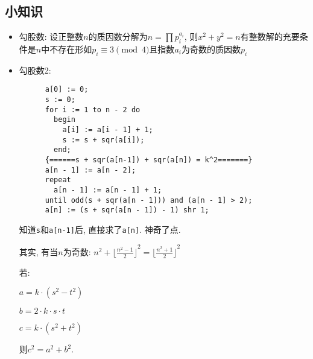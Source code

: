\documentclass[landscape, twocolumn, 8pt, a4paper, twoside]{extarticle}
\begin{document}
  \subsection{小知识}
  \begin{itemize}
  \item 勾股数: 设正整数$n$的质因数分解为$n = \prod p_i ^ {a_i}$, 
    则$x^2+y^2=n$有整数解的充要条件是$n$中不存在形如$p_i \equiv 3\pmod{4}$且指数$a_i$为奇数的质因数$p_i$
  \item 勾股数2: 
    \begin{verbatim}
      a[0] := 0;
      s := 0;
      for i := 1 to n - 2 do
        begin
          a[i] := a[i - 1] + 1;
          s := s + sqr(a[i]);
        end;
      {======s + sqr(a[n-1]) + sqr(a[n]) = k^2=======}
      a[n - 1] := a[n - 2];
      repeat
        a[n - 1] := a[n - 1] + 1;
      until odd(s + sqr(a[n - 1])) and (a[n - 1] > 2);
      a[n] := (s + sqr(a[n - 1]) - 1) shr 1;
    \end{verbatim}

    知道\texttt{s}和\texttt{a[n-1]}后, 直接求了\texttt{a[n]}. 神奇了点. 

    其实, 有当$n$为奇数: $n^2+{\lfloor\frac{n^2-1}{2}\rfloor}^2={\lfloor\frac{n^2+1}{2}\rfloor}^2$

    若: 

    $a=k\cdot(s^2 - t^2)$

    $b=2\cdot k\cdot s\cdot t$

    $c=k\cdot(s^2 + t^2)$

    则$c^2=a^2+b^2$. 


\end{itemize}
\end{document}
